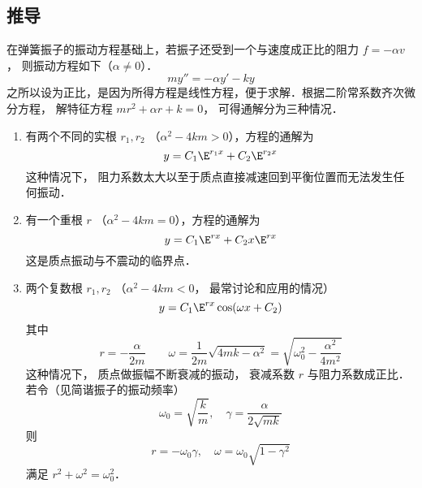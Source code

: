 \subsection{推导}
在弹簧振子的振动方程基础上，若振子还受到一个与速度成正比的阻力 $f =  - \alpha v$， 则振动方程如下（$\alpha \ne 0$）．
\begin{equation}
my'' =  - \alpha y' - ky
\end{equation}
之所以设为正比，是因为所得方程是线性方程，便于求解．根据二阶常系数齐次微分方程， 解特征方程 $m r^2 + \alpha r + k = 0$， 可得通解分为三种情况．
\begin{enumerate}
\item 有两个不同的实根 $r_1,r_2$ （${\alpha ^2} - 4km > 0$），方程的通解为
\begin{equation}
y = C_1 \E^{r_1 x} + C_2 \E^{r_2 x}
\end{equation}
这种情况下， 阻力系数太大以至于质点直接减速回到平衡位置而无法发生任何振动．

\item 有一个重根 $r$ （${\alpha ^2} - 4km = 0$），方程的通解为
\begin{equation}
y = {C_1}{\E^{rx}} + {C_2}x{\E^{rx}}
\end{equation}
这是质点振动与不震动的临界点．

\item 两个复数根 $r_1,r_2$ （${\alpha ^2} - 4km < 0$， 最常讨论和应用的情况）
\begin{equation}
y = C_1 \E^{rx}\cos(\omega x + C_2)
\end{equation}
其中
\begin{equation}
r =  - \frac{\alpha }{2m}
\qquad
\omega = \frac{1}{2m}\sqrt {4mk - {\alpha ^2}}  = \sqrt {\omega _0^2 - \frac{\alpha ^2}{4 m^2}}
\end{equation}
这种情况下， 质点做振幅不断衰减的振动， 衰减系数 $r$ 与阻力系数成正比． 若令（见简谐振子的振动频率）
\begin{equation}
{\omega _0} = \sqrt {\frac{k}{m}},\quad {\gamma  = \frac{\alpha }{2\sqrt{mk}}}
\end{equation}
则 
\begin{equation}
r =  - {\omega _0}\gamma,\quad \omega  = {\omega _0}\sqrt {1 - {\gamma ^2}}
\end{equation}
满足
${r^2} + {\omega ^2} = \omega _0^2$．


\end{enumerate}


